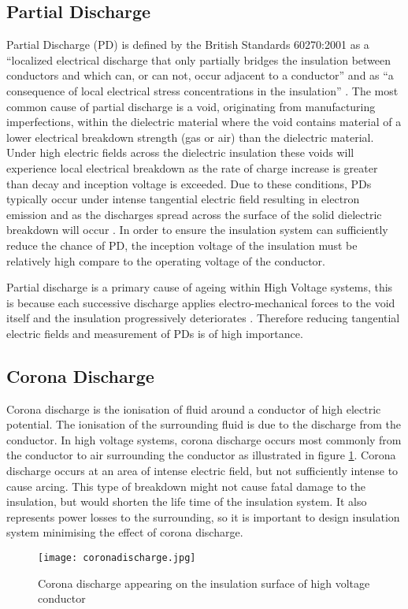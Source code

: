 \subsection{Partial Discharge}
Partial Discharge (PD) is defined by the British Standards 60270:2001 as a “localized electrical discharge that only partially bridges the insulation between conductors and which can, or can not, occur adjacent to a conductor” and as “a consequence of local electrical stress concentrations in the insulation” \cite{60270}. 
The most common cause of partial discharge is a void, originating from manufacturing imperfections, within the dielectric material where the void contains material of a lower electrical breakdown strength (gas or air) than the dielectric material. 
Under high electric fields across the dielectric insulation these voids will experience local electrical breakdown as the rate of charge increase is greater than decay and inception voltage is exceeded. 
Due to these conditions, PDs typically occur under intense tangential electric field resulting in electron emission \cite{surfaceflashover} and as the discharges spread across the surface of the solid dielectric breakdown will occur \cite{kuffel2000high}. In order to ensure the insulation system can sufficiently reduce the chance of PD, the inception voltage of the insulation must be relatively high compare to the operating voltage of the conductor.

Partial discharge is a primary cause of ageing within High Voltage systems, this is because each successive discharge applies electro-mechanical forces to the void itself and the insulation progressively deteriorates \cite{PDageing}. Therefore reducing tangential electric fields and measurement of PDs is of high importance. 

\subsection{Corona Discharge}
Corona discharge is the ionisation of fluid around a conductor of high electric potential. The ionisation of the surrounding fluid is due to the discharge from the conductor. In high voltage systems, corona discharge occurs most commonly from the conductor to air surrounding the conductor as illustrated in figure \ref{figure:corona}. Corona discharge occurs at an area of intense electric field, but not sufficiently intense to cause arcing. This type of breakdown might not cause fatal damage to the insulation, but would shorten the life time of the insulation system. It also represents power losses to the surrounding, so it is important to design insulation system minimising the effect of corona discharge. 

\begin{figure}[!h]
   \centering
   \texttt{[image: coronadischarge.jpg]}
   \caption{Corona discharge appearing on the insulation surface of high voltage conductor}
   \label{figure:corona}
\end{figure}
